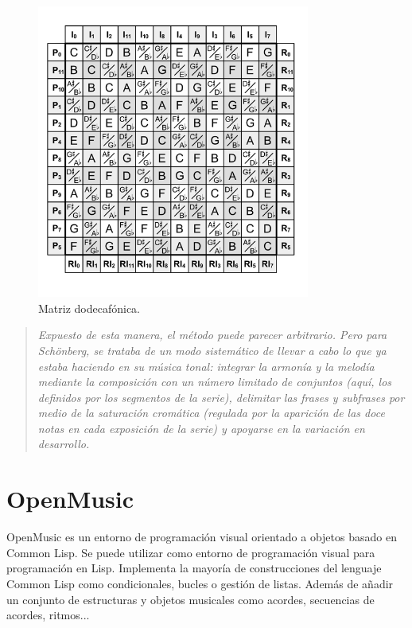 \documentclass[a4paper,openany,12pt]{memoir}
\begin{document}
\begin{figure}
\centering
\includegraphics[width=0.8\textwidth]{img/12_tone_matrix.jpg} 
\caption{Matriz dodecafónica. \cite{musictheory}} \label{fig:matrix}
\end{figure}

\begin{quote}
\em Expuesto de esta manera, el método puede parecer arbitrario. Pero para Schönberg, se trataba de un modo sistemático de llevar a cabo lo que ya estaba haciendo en su música tonal: integrar la armonía y la melodía mediante la composición con un número limitado de conjuntos (aquí, los definidos por los segmentos de la serie), delimitar las frases y subfrases por medio de la saturación cromática (regulada por la aparición de las doce notas en cada exposición de la serie) y apoyarse en la variación en desarrollo. \cite{palisca}
\end{quote}

\section{OpenMusic}

OpenMusic \cite{openmusic} es un entorno de programación visual orientado a objetos basado en Common Lisp. Se puede utilizar como entorno de programación visual para programación en Lisp. Implementa la mayoría de construcciones del lenguaje Common Lisp como condicionales, bucles o gestión de listas. Además de añadir un conjunto de estructuras y objetos musicales como acordes, secuencias de acordes, ritmos...
\end{document}
